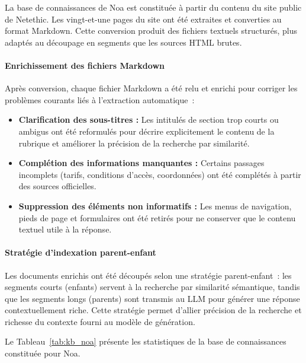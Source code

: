 La base de connaissances de Noa est constituée à partir du contenu du site public
de Netethic.
Les vingt-et-une pages du site ont été extraites et converties au format Markdown.
Cette conversion produit des fichiers textuels structurés,
plus adaptés au découpage en segments que les sources HTML brutes.

\paragraph{Enrichissement des fichiers Markdown}\mbox{}\newline

Après conversion, chaque fichier Markdown a été relu et enrichi
pour corriger les problèmes courants liés à l'extraction automatique~:

\begin{itemize}
    \item \textbf{Clarification des sous-titres :} Les intitulés de section trop courts
          ou ambigus ont été reformulés pour décrire explicitement le contenu
          de la rubrique et améliorer la précision de la recherche par similarité.
    \item \textbf{Complétion des informations manquantes :} Certains passages
          incomplets (tarifs, conditions d'accès, coordonnées) ont été complétés
          à partir des sources officielles.
    \item \textbf{Suppression des éléments non informatifs :} Les menus de navigation,
          pieds de page et formulaires ont été retirés pour ne conserver
          que le contenu textuel utile à la réponse.
\end{itemize}

\paragraph{Stratégie d'indexation parent-enfant}\mbox{}\newline

Les documents enrichis ont été découpés selon une stratégie parent-enfant~:
les segments courts (enfants) servent à la recherche par similarité sémantique,
tandis que les segments longs (parents) sont transmis au LLM pour générer
une réponse contextuellement riche.
Cette stratégie permet d'allier précision de la recherche et richesse
du contexte fourni au modèle de génération.

Le Tableau~\ref{tab:kb_noa} présente les statistiques de la base de connaissances
constituée pour Noa.

